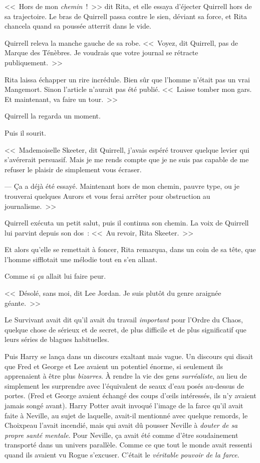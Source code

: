 <<~Hors de mon \emph{chemin}~!~>> dit Rita, et elle essaya d'éjecter Quirrell hors de sa trajectoire. Le bras de Quirrell passa contre le sien, déviant sa force, et Rita chancela quand sa poussée atterrit dans le vide.

Quirrell releva la manche gauche de sa robe. <<~Voyez, dit Quirrell, pas de Marque des Ténèbres. Je voudrais que votre journal se rétracte publiquement.~>>

Rita laissa échapper un rire incrédule. Bien sûr que l'homme n'était pas un vrai Mangemort. Sinon l'article n'aurait pas été publié. <<~Laisse tomber mon gars. Et maintenant, va faire un tour.~>>

Quirrell la regarda un moment.

Puis il sourit.

<<~Mademoiselle Skeeter, dit Quirrell, j'avais espéré trouver quelque levier qui s'avérerait persuasif. Mais je me rends compte que je ne suis pas capable de me refuser le plaisir de simplement vous écraser.

--- Ça a déjà été essayé. Maintenant hors de mon chemin, pauvre type, ou je trouverai quelques Aurors et vous ferai arrêter pour obstruction au journalisme.~>>

Quirrell exécuta un petit salut, puis il continua son chemin. La voix de Quirrell lui parvint depuis son dos~: <<~Au revoir, Rita Skeeter.~>>

Et alors qu'elle se remettait à foncer, Rita remarqua, dans un coin de sa tête, que l'homme sifflotait une mélodie tout en s'en allant.

Comme si \emph{ça} allait lui faire peur.


<<~Désolé, sans moi, dit Lee Jordan. Je suis plutôt du genre araignée géante.~>>

Le Survivant avait dit qu'il avait du travail \emph{important} pour l'Ordre du Chaos, quelque chose de sérieux et de secret, de plus difficile et de plus significatif que leurs séries de blagues habituelles.

Puis Harry se lança dans un discours exaltant mais vague. Un discours qui disait que Fred et George et Lee avaient un potentiel énorme, si seulement ils apprenaient à être plus \emph{bizarres}. À rendre la vie des gens \emph{surréaliste}, au lieu de simplement les surprendre avec l'équivalent de seaux d'eau posés au-dessus de portes. (Fred et George avaient échangé des coups d'œils intéressés, ils n'y avaient jamais songé avant). Harry Potter avait invoqué l'image de la farce qu'il avait faite à Neville, au sujet de laquelle, avait-il mentionné avec quelque remords, le Choixpeau l'avait incendié, mais qui avait dû pousser Neville à \emph{douter de sa propre santé mentale}. Pour Neville, ça avait été comme d'être soudainement transporté dans un univers parallèle. Comme ce que tout le monde avait ressenti quand ils avaient vu Rogue s'excuser. C'était le \emph{véritable pouvoir de la farce}.

